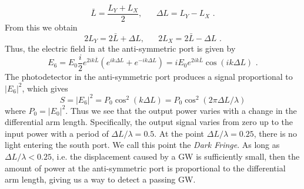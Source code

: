 \documentclass[11pt]{cuthesis}
\newcommand{\fs}{\text{ .}}
\begin{document}
\begin{equation}
\bar{L}=\frac{L_Y+L_X}{2}, \hspace{20pt} \Delta L =L_Y-L_X \fs
\end{equation}
From this we obtain
\begin{equation}
2L_Y=2\bar{L}+\Delta L, \hspace{20pt} 2L_X=2\bar{L}-\Delta L \fs 
\end{equation}
Thus, the electric field in at the anti-symmetric port is given by
\begin{equation}
E_6=E_0\frac{i}{2}e^{2ik\bar{L}}\left( e^{ik\Delta L} + e^{-ik\Delta L} \right)=iE_0e^{2ik\bar{L}}\cos(ik\Delta L) \fs
\end{equation}
The photodetector in the anti-symmetric port produces a signal proportional to $|E_6|^2$, which gives 
\begin{equation}
S=|E_6|^2=P_0 \cos^2(k \Delta L)=P_0 \cos^2(2\pi \Delta L / \lambda) 
\end{equation}
where $P_0=|E_0|^2$. Thus we see that the output power varies with a change in the differential arm length. Specifically, the output signal varies from zero up to the input power with a period of $\Delta L/\lambda=0.5$. At the point $\Delta L/\lambda=0.25$, there is no light entering the south port. We call this point the \emph{Dark Fringe}. As long as $\Delta L/\lambda<0.25$, i.e. the displacement caused by a GW is sufficiently small, then the amount of power at the anti-symmetric port is proportional to the differential arm length, giving us a way to detect a passing GW.

\end{document}

